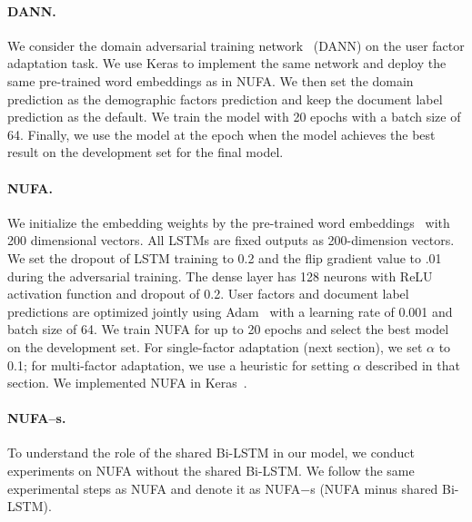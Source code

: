 \paragraph{DANN.} We consider the domain adversarial training network~\cite{ganin2016domain} (DANN) on the user factor adaptation task. We use Keras to implement the same network and deploy the same pre-trained word embeddings as in NUFA. We then set the domain prediction as the demographic factors prediction and keep the document label prediction as the default. We train the model with 20 epochs with a batch size of 64. Finally, we use the model at the epoch when the model achieves the best result on the development set for the final model.


\paragraph{NUFA.}
We initialize the embedding weights by the pre-trained word embeddings~\cite{mikolov2013distributed, pennington2014glove} with 200 dimensional vectors. All LSTMs are fixed outputs as 200-dimension vectors. We set the dropout of LSTM training to 0.2 and the flip gradient value to .01 during the adversarial training. The dense layer has 128 neurons with ReLU activation function and dropout of 0.2. User factors and document label predictions are optimized jointly using Adam~\cite{kingma2014adam} with a learning rate of 0.001 and batch size of 64. We train NUFA for up to 20 epochs and select the best model on the development set. 
For single-factor adaptation (next section), we set $\alpha$ to 0.1;
for multi-factor adaptation, we use a heuristic for setting $\alpha$ described in that section.
We implemented NUFA in Keras~\cite{chollet2015keras}.

\paragraph{NUFA--s.} 
To understand the role of the shared Bi-LSTM in our model, we conduct experiments on NUFA without the shared Bi-LSTM. We follow the same experimental steps as NUFA and denote it as NUFA$-$s (NUFA minus shared Bi-LSTM). %

